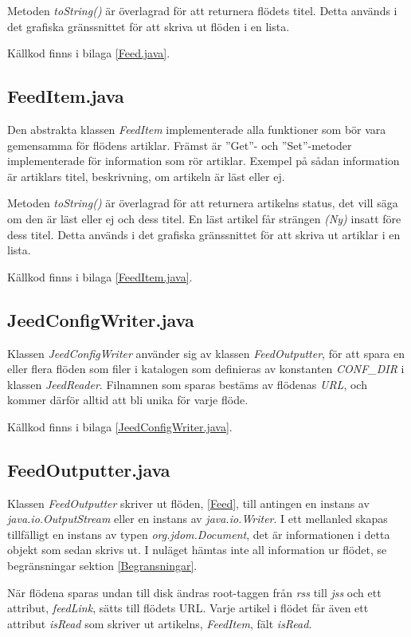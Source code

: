 \documentclass[titlepage, twoside, a4paper, 12pt]{article}
\begin{document}
Metoden \textit{toString()} är överlagrad för att returnera flödets
titel. Detta används i det grafiska gränssnittet för att skriva ut
flöden i en lista.

Källkod finns i bilaga \ref{Feed.java}.

\subsection{FeedItem.java}\label{FeedItem}
Den abstrakta klassen \textit{FeedItem} implementerade alla funktioner
som bör vara gemensamma för flödens artiklar. Främst är ''Get''- och
''Set''-metoder implementerade för information som rör
artiklar. Exempel på sådan information är artiklars titel,
beskrivning, om artikeln är läst eller ej.

Metoden \textit{toString()} är överlagrad för att returnera artikelns
status, det vill säga om den är läst eller ej och dess titel. En läst
artikel får strängen \textit{(Ny)} insatt före dess titel. Detta
används i det grafiska gränssnittet för att skriva ut artiklar i en
lista.

Källkod finns i bilaga \ref{FeedItem.java}.


\subsection{JeedConfigWriter.java}\label{JeedConfigWriter}
Klassen \textit{JeedConfigWriter} använder sig av klassen
\textit{FeedOutputter}, för att spara en eller flera flöden som filer
i katalogen som definieras av konstanten \textit{CONF\_DIR} i klassen
\textit{JeedReader}. Filnamnen som sparas bestäms av flödenas
\textit{URL}, och kommer därför alltid att bli unika för varje flöde.

Källkod finns i bilaga \ref{JeedConfigWriter.java}.

\subsection{FeedOutputter.java}\label{FeedOutputter}
Klassen \textit{FeedOutputter} skriver ut flöden, \ref{Feed}, till
antingen en instans av \textit{java.io.OutputStream} eller en instans
av \textit{java.io.Writer}. I ett mellanled skapas tillfälligt en
instans av typen \textit{org.jdom.Document}, det är informationen i
detta objekt som sedan skrivs ut. I nuläget hämtas inte all
information ur flödet, se begränsningar sektion
\ref{Begransningar}. %

När flödena sparas undan till disk ändras root-taggen från
\textit{rss} till \textit{jss} och ett attribut, \textit{feedLink},
sätts till flödets URL. Varje artikel i flödet får även ett attribut
\textit{isRead} som skriver ut artikelns, \textit{FeedItem}, fält
\textit{isRead}.
\end{document}
